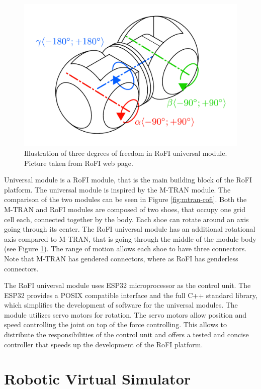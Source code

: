 \documentclass[
  digital, %
  table,   %
  oneside, %
  nolof,     %
  nolot,     %
]{fithesis3}
\begin{document}
\begin{figure}
    \centering
    \includegraphics[height=.4\textheight]{data/rofi_universal_module_dof.pdf}
    \caption{Illustration of three degrees of freedom in RoFI universal module. Picture taken from RoFI web page\cite{rofi-web}.}
    \label{fig:univ-module-dof}
\end{figure}

Universal module is a RoFI module, that is the main building block of the RoFI platform.
The universal module is inspired by the M-TRAN\cite{mtran} module.
The comparison of the two modules can be seen in Figure \ref{fig:mtran-rofi}.
Both the M-TRAN and RoFI modules are composed of two shoes, that occupy one grid cell each, connected together by the body.
Each shoe can rotate around an axis going through its center.
The RoFI universal module has an additional rotational axis compared to M-TRAN, that is going through the middle of the module body (see Figure \ref{fig:univ-module-dof}).
The range of motion allows each shoe to have three connectors.
Note that M-TRAN has gendered connectors, where as RoFI has genderless connectors.

The RoFI universal module uses ESP32 microprocessor as the control unit.
The ESP32 provides a POSIX compatible interface and the full C++ standard library, which simplifies the development of software for the universal modules.
The module utilizes servo motors for rotation.
The servo motors allow position and speed controlling the joint on top of the force controlling.
This allows to distribute the responsibilities of the control unit and offers a tested and concise controller that speeds up the development of the RoFI platform.


\chapter{Robotic Virtual Simulator}
\end{document}
